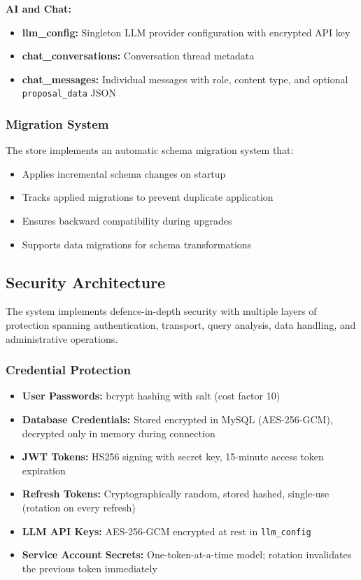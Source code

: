 \textbf{AI and Chat:}
\begin{itemize}[leftmargin=*]
    \item \textbf{llm\_config:} Singleton LLM provider configuration with encrypted API key
    \item \textbf{chat\_conversations:} Conversation thread metadata
    \item \textbf{chat\_messages:} Individual messages with role, content type, and optional \texttt{proposal\_data} JSON
\end{itemize}

\subsubsection{Migration System}

The store implements an automatic schema migration system that:
\begin{itemize}[leftmargin=*]
    \item Applies incremental schema changes on startup
    \item Tracks applied migrations to prevent duplicate application
    \item Ensures backward compatibility during upgrades
    \item Supports data migrations for schema transformations
\end{itemize}

\subsection{Security Architecture}

The system implements defence-in-depth security with multiple layers of protection spanning authentication, transport, query analysis, data handling, and administrative operations.

\subsubsection{Credential Protection}

\begin{itemize}[leftmargin=*]
    \item \textbf{User Passwords:} bcrypt hashing with salt (cost factor 10)
    \item \textbf{Database Credentials:} Stored encrypted in MySQL (AES-256-GCM), decrypted only in memory during connection
    \item \textbf{JWT Tokens:} HS256 signing with secret key, 15-minute access token expiration
    \item \textbf{Refresh Tokens:} Cryptographically random, stored hashed, single-use (rotation on every refresh)
    \item \textbf{LLM API Keys:} AES-256-GCM encrypted at rest in \texttt{llm\_config}
    \item \textbf{Service Account Secrets:} One-token-at-a-time model; rotation invalidates the previous token immediately
\end{itemize}

